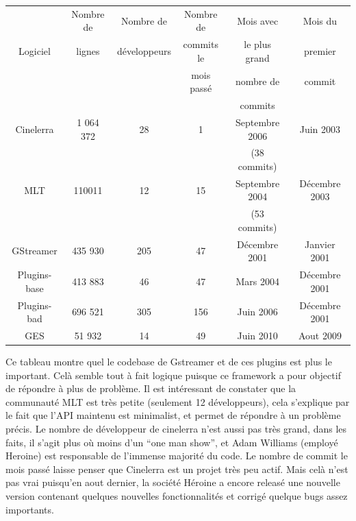 \begin{center}

  \begin{tabular}{ | c | c | c | c |c| c |}

    \hline

         &Nombre de& Nombre de & Nombre de&Mois avec& Mois du \\

Logiciel &lignes & développeurs& commits le&le plus grand & premier\\

         &&&mois passé&nombre de&commit\\

         &&&&commits&\\

\hline \hline

Cinelerra&1 064 372 &28&1& Septembre 2006&Juin 2003\\

&&&&(38 commits)&\\ \hline

MLT\index{MLT}& 110011 &12&15& Septembre 2004&Décembre 2003\\

&&&&(53 commits)& \\ \hline

GStreamer& 435 930  &205&47& Décembre 2001&Janvier 2001\\

Plugins-base& 413 883 &46&47& Mars 2004&Décembre 2001\\

Plugins-bad& 696 521 &305&156& Juin 2006&Décembre 2001\\

GES& 51 932 &14&49& Juin 2010&Aout 2009\\

\hline

  \end{tabular}

\end{center}

Ce tableau montre quel le codebase de Gstreamer et de ces plugins est plus
le important. Celà semble tout à fait logique puisque ce framework a
pour objectif de répondre à plus de problème. Il est intéressant de
constater que la communauté MLT est très petite (seulement
12 développeurs), cela s'explique par le fait que l'API maintenu est
minimalist, et permet de répondre à un problème précis.  Le nombre de
développeur de cinelerra n'est aussi pas très grand, dans les faits, il
s'agit plus où moins d'un ``one man show'', et Adam Williams (employé
Heroine) est responsable de l'immense majorité du code. Le nombre de
commit le mois passé laisse penser que Cinelerra est un projet très peu
actif. Mais celà n'est pas vrai puisqu'en aout dernier, la société
Héroine a encore releasé une nouvelle version contenant quelques
nouvelles fonctionnalités et corrigé quelque bugs assez importants.

